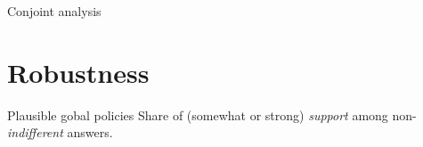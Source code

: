 \documentclass[aspectratio=169,xcolor=dvipsnames, 11pt,mathserif]{beamer}
\begin{document}
\begin{frame}{Conjoint analysis}
\begin{figure}
\begin{subfigure}{.50\textwidth}
\end{subfigure}
\end{figure}
\end{frame}


\section{Robustness}

\begin{frame}{Plausible gobal policies\label{solidarity_support_relative}}
\centering Share of (somewhat or strong) \textit{support} among non-\textit{indifferent} answers. %
\end{frame}
\end{document}
